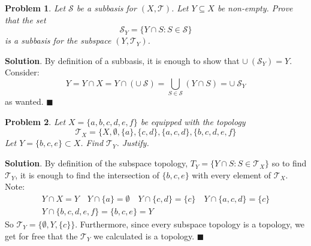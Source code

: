 \documentclass[12pt]{article}
\renewcommand{\=}[1]{\stackrel{#1}{=}} %
\providecommand{\T}{\mathcal{T}}
\newtheorem{p}{Problem}[section]
\theoremstyle{definition}
\newenvironment{s}{%
        \begin{trivlist} \item \textbf{Solution}. }{%
            \hspace*{\fill} $\blacksquare$\end{trivlist}}%
\begin{document}
\newpage

\begin{p}
    Let $\mathscr{S}$ be a subbasis for $(X,\T)$. Let $Y\subseteq X$ be non-empty. Prove that the set
    \[ \mathscr{S}_Y = \{Y\cap S: S\in\mathscr{S}\} \]
    is a subbasis for the subspace $(Y,\T_Y)$.
\end{p}
\begin{s}
    By definition of a subbasis, it is enough to show that $\cup\:(\mathscr{S}_Y) = Y$. Consider:
    \[ Y = Y \cap X = Y \cap (\cup\:\mathscr{S}) = \bigcup_{S\in\mathscr{S}} (Y \cap S) = \cup\:\mathscr{S}_Y\]
    as wanted.
\end{s}

\begin{p}
    Let $X = \{a,b,c,d,e,f\}$ be equipped with the topology
    \[ \T_X = \{X,\emptyset,\{a\},\{c,d\},\{a,c,d\},\{b,c,d,e,f\} \]
    Let $Y = \{b,c,e\} \subset X$. Find $\T_Y$. Justify.
\end{p}
\begin{s}
    By definition of the subspace topology, 
    $T_Y = \{Y\cap S: S\in \T_X\}$ so to find $\T_Y$, it is enough to find the intersection of $\{b,c,e\}$ with every element
    of $\T_X$. Note:
    \begin{align*}
        Y \cap X = Y \quad Y \cap \{a\} = \emptyset \quad Y \cap \{c,d\} = \{c\} \quad Y \cap \{a,c,d\} = \{c\} \\
        Y \cap \{b,c,d,e,f\} = \{b,c,e\} = Y
    \end{align*}
    So $\T_Y = \{\emptyset, Y, \{c\}\}$. Furthermore, since every subspace
    topology is a topology, we get for free that the $\T_Y$ we calculated is a topology.
\end{s}
\end{document}
